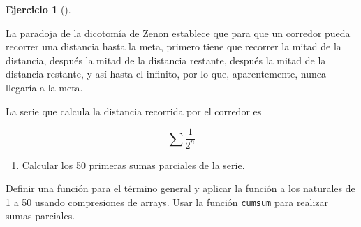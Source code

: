 \documentclass[
  a4paper,
]{scrreport}
\providecommand{\tightlist}{%
  \setlength{\itemsep}{0pt}\setlength{\parskip}{0pt}}\usepackage{longtable,booktabs,array}
\theoremstyle{definition}
\newtheorem{exercise}{Ejercicio}[chapter]
\theoremstyle{remark}
\begin{document}
\leavevmode{}%
\begin{exercise}[]\label{exr-paradoja-dicotomia-zenon}

La
\href{https://es.wikipedia.org/wiki/Paradojas_de_Zen\%C3\%B3n\#Paradoja_de_la_dicotom\%C3\%ADa}{paradoja
de la dicotomía de Zenon} establece que para que un corredor pueda
recorrer una distancia hasta la meta, primero tiene que recorrer la
mitad de la distancia, después la mitad de la distancia restante,
después la mitad de la distancia restante, y así hasta el infinito, por
lo que, aparentemente, nunca llegaría a la meta.

La serie que calcula la distancia recorrida por el corredor es

\[
\sum \frac{1}{2^n}
\]

\begin{enumerate}
\def\labelenumi{\alph{enumi}.}
\tightlist
\item
  Calcular los 50 primeras sumas parciales de la serie.
\end{enumerate}

\begin{tcolorbox}[enhanced jigsaw, colframe=quarto-callout-note-color-frame, breakable, colback=white, coltitle=black, left=2mm, toptitle=1mm, colbacktitle=quarto-callout-note-color!10!white, bottomtitle=1mm, opacityback=0, opacitybacktitle=0.6, title=\textcolor{quarto-callout-note-color}{\faInfo}\hspace{0.5em}{Ayuda}, titlerule=0mm, toprule=.15mm, arc=.35mm, leftrule=.75mm, rightrule=.15mm, bottomrule=.15mm]

Definir una función para el término general y aplicar la función a los
naturales de 1 a 50 usando
\href{https://aprendeconalf.es/manual-julia/tipos-datos-compuestos.html\#comprensi\%C3\%B3n-de-arrays}{compresiones
de arrays}. Usar la función \texttt{cumsum} para realizar sumas
parciales.

\end{tcolorbox}

\begin{tcolorbox}[enhanced jigsaw, colframe=quarto-callout-tip-color-frame, breakable, colback=white, coltitle=black, left=2mm, toptitle=1mm, colbacktitle=quarto-callout-tip-color!10!white, bottomtitle=1mm, opacityback=0, opacitybacktitle=0.6, title=\textcolor{quarto-callout-tip-color}{\faLightbulb}\hspace{0.5em}{Solución 1}, titlerule=0mm, toprule=.15mm, arc=.35mm, leftrule=.75mm, rightrule=.15mm, bottomrule=.15mm]


\end{tcolorbox}
\end{exercise}
\end{document}

